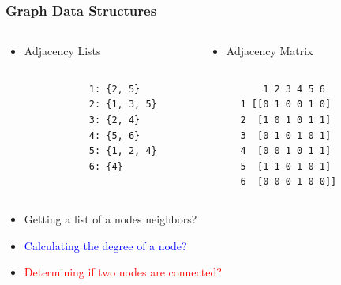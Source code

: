 \documentclass[xcolor={dvipsnames}]{beamer}
\begin{document}
\begin{frame}[fragile]  
\frametitle{Graph Data Structures}



\begin{columns}
\begin{column}{.5\textwidth}


\begin{itemize}
\item Adjacency Lists
\end{itemize}


\end{column}
\begin{column}{.5\textwidth}

\begin{itemize}
\item Adjacency Matrix
\end{itemize}

\end{column}
\end{columns}


\begin{columns}
\begin{column}{.1\textwidth}
${}$
\end{column}

\begin{column}{.5\textwidth}

\color{red}

\begin{table}
\begin{verbatim}
1: {2, 5}
2: {1, 3, 5}
3: {2, 4}
4: {5, 6}
5: {1, 2, 4}
6: {4}

\end{verbatim}

\end{table}
\color{black}

\end{column}
\begin{column}{.5\textwidth}

\color{red}
\begin{table}
\begin{verbatim}
    1 2 3 4 5 6
1 [[0 1 0 0 1 0]
2  [1 0 1 0 1 1]
3  [0 1 0 1 0 1]
4  [0 0 1 0 1 1]
5  [1 1 0 1 0 1]
6  [0 0 0 1 0 0]]

\end{verbatim}
\end{table}
\color{black}

\end{column}
\end{columns}




\begin{itemize}
\item<2-> Getting a list of a nodes neighbors?
\item<3-> \textcolor{blue}{Calculating the degree of a node?}
\item<4-> \textcolor{red}{Determining if two nodes are connected?}
\end{itemize}


\end{frame}
\end{document}
